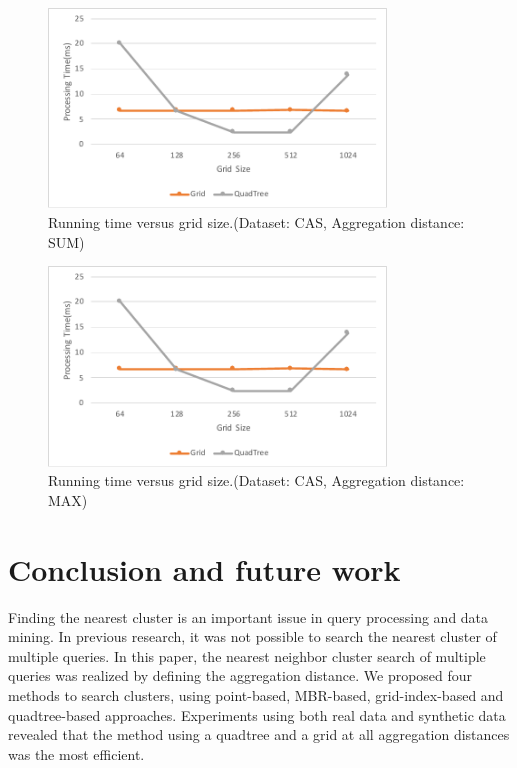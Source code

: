 \documentclass[a4paper,11pt]{report}
\theoremstyle{mytheoremstyle}
\begin{document}
\begin{figure}
    \begin{center}
        \includegraphics[width=0.8\textwidth]{src/images/CAS-SUM-GridSize.pdf}
    \end{center}
    \caption{Running time versus grid size.(Dataset: CAS, Aggregation distance: SUM)}
    \label{fig:sum-gridSize}
\end{figure}

\begin{figure}
    \begin{center}
        \includegraphics[width=0.8\textwidth]{src/images/CAS-SUM-GridSize.pdf}
    \end{center}
    \caption{Running time versus grid size.(Dataset: CAS, Aggregation distance: MAX)}
    \label{fig:max-gridSize}
\end{figure}

\chapter{Conclusion and future work}
\label{section:conclusion}

Finding the nearest cluster is an important issue in query processing and data mining. In previous research, it was not possible to search the nearest cluster of multiple queries. In this paper, the nearest neighbor cluster search of multiple queries was realized by defining the aggregation distance. We proposed four methods to search clusters, using point-based, MBR-based, grid-index-based and quadtree-based approaches. Experiments using both real data and synthetic data revealed that the method using a quadtree and a grid at all aggregation distances was the most efficient.
\end{document}
